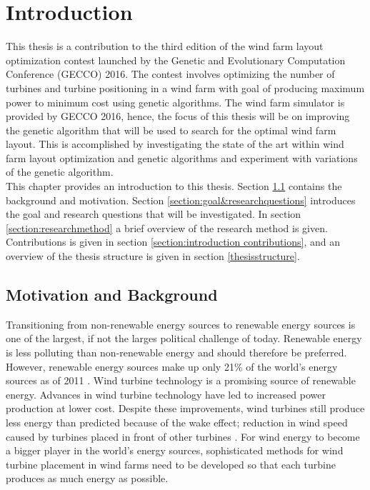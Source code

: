 \chapter{Introduction}\label{chapter:introduction}
This thesis is a contribution to the third edition of the wind farm layout optimization contest launched by the Genetic and Evolutionary Computation Conference (GECCO) 2016. The contest involves optimizing the number of turbines and turbine positioning in a wind farm with goal of producing maximum power to minimum cost using genetic algorithms. The wind farm simulator is provided by GECCO 2016, hence, the focus of this thesis will be on improving the genetic algorithm that will be used to search for the optimal wind farm layout. This is accomplished by investigating the state of the art within wind farm layout optimization and genetic algorithms and experiment with variations of the genetic algorithm.\\

\noindent This chapter provides an introduction to this thesis. Section \ref{section:motivation&background} contains the background and motivation. Section \ref{section:goal&researchquestions} introduces the goal and research questions that will be investigated. In section \ref{section:researchmethod} a brief overview of the research method is given. Contributions is given in section \ref{section:introduction contributions}, and an overview of the thesis structure is given in section \ref{thesisstructure}.


\section{Motivation and Background}\label{section:motivation&background}
Transitioning from non-renewable energy sources to renewable energy sources is one of the largest, if not the larges political challenge of today. Renewable energy is less polluting than non-renewable energy and should therefore be preferred. However, renewable energy sources make up only 21\% of the world's energy sources as of 2011 \citep{url1}. Wind turbine technology is a promising source of renewable energy. Advances in wind turbine technology have led to increased power production at lower cost. Despite these improvements, wind turbines still produce less energy than predicted because of the wake effect; reduction in wind speed caused by turbines placed in front of other turbines \citep{Samorani}. For wind energy to become a bigger player in the world's energy sources, sophisticated methods for wind turbine placement in wind farms need to be developed so that each turbine produces as much energy as possible. \\

